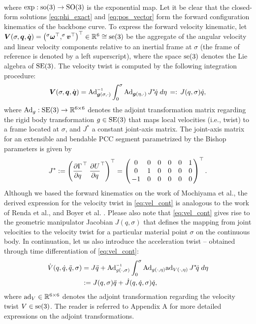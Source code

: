 {\begin{align}
\end{align}
%
where $\exp: {\text{so}(3)} \to {\text{SO}(3)}$ is the exponential map. Let it be clear that the closed-form solutions \eqref{eq:phi_exact} and \eqref{eq:pos_vector} form the forward configuration kinematics of the backbone curve. To express the forward velocity kinematic, let  $\boldsymbol{V}(\sigma,\boldsymbol{q},\dot{\boldsymbol{q}}) = \left(^\sigma \boldsymbol{\omega}^\top,^\sigma \boldsymbol{v}^\top \right)^\top \in \mathbb{R}^6 \cong {\text{se}(3)}
$ be the aggregate of the angular velocity and linear velocity components relative to an inertial frame at $\sigma$ (the frame of reference is denoted by a left superscript), where the space ${\text{se}(3)}$ denotes the Lie algebra of ${\text{SE}(3)}$. The velocity twist is computed by the following integration procedure:
%
\begin{equation}
 \vec{V}(\sigma,\vec{q},\dot{\vec{q}}) = \Ad_{\mat{g}(\sigma,\cdot)}\inv \int_0^\sigma \Ad_{\mat{g}(\eta,\cdot)}\, J^*\! \dot{q}\;d\eta
 \,=:\, J(q,\sigma) \dot{q}, \label{eq:vel_cont}
\end{equation}
%
where $\text{Ad}_g: {\text{SE}(3)} \to \mathbb{R}^{6\times 6}$ denotes the adjoint transformation matrix regarding the rigid body transformation $g \in {\text{SE}(3)}$ that maps local velocities (i.e., twist) to a frame located at $\sigma$, and $J^*$ a constant joint-axis matrix. The joint-axis matrix for an extensible and bendable PCC segment parametrized by the Bishop parameters is given by
%
\begin{equation}
\renewcommand*{\arraystretch}{1}{}
J^* := \left(\dfrac{\p \Gamma}{\p q}^\top \; \dfrac{\p U}{\p q}^\top \right)^\top  = \begin{pmatrix}
\,0 & 0 & 0 & 0 & 0 & 1 \, \\
\,0 & 1 & 0 & 0 & 0 & 0 \,  \\
\,-1 & 0 & 0 & 0 & 0 & 0 \,  \\
\end{pmatrix}^\top. \label{eq:joint-axis-matrix}
\end{equation}
%
Although we based the forward kinematics on the work of Mochiyama et al.\cite{Mochiyama2003}, the derived expression for the velocity twist in \eqref{eq:vel_cont} is analogous to the work of Renda et al.\cite{Renda2018,Renda2020}, and Boyer et al. \cite{Boyer2010,Boyer2021}. Please also note that \eqref{eq:vel_cont} gives rise to the geometric manipulator Jacobian $J(q,\sigma)
$ that defines the mapping from joint velocities to the velocity twist for a particular material point $\sigma$ on the continuous body. In continuation, let us also introduce the acceleration twist\cite{Boyer2021,Mochiyama2003,Renda2018} -- obtained through time differentiation of \eqref{eq:vel_cont}:
%
\begin{align}
\dot{V}(q,\dot{q},\ddot{q},\sigma) & = J \ddot{q} + \Ad_{g(\cdot,\sigma)} \inv \int_0^\sigma \Ad_{g(\cdot,\eta)}
\ad_{V(\cdot,\eta)} \, J^*\! \dot{q}\;d\eta \notag \\
& := J(q,\sigma)\ddot{q} + \dot{J}(q,\dot{q},\sigma) \dot{q},
\label{eq:acceleration}
\end{align}
%
where $\text{ad}_{V} \in \mathbb{R}^{6\times 6}$ denotes the adjoint transformation regarding the velocity twist $V \in {\text{se}(3)}$. The reader is referred to Appendix A for more detailed expressions on the adjoint transformations.
%
}
